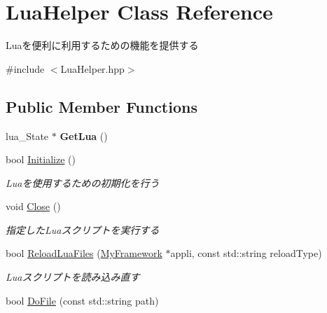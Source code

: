 \hypertarget{class_lua_helper}{}\section{Lua\+Helper Class Reference}
\label{class_lua_helper}


Luaを便利に利用するための機能を提供する  




{\ttfamily \#include $<$Lua\+Helper.\+hpp$>$}

\subsection*{Public Member Functions}
\begin{DoxyCompactItemize}
\item 
lua\+\_\+\+State $\ast$ {\bfseries Get\+Lua} ()\hypertarget{class_lua_helper_a3738931605b20ba3a93884f29f7dbb04}{}\label{class_lua_helper_a3738931605b20ba3a93884f29f7dbb04}

\item 
bool \hyperlink{class_lua_helper_aca3c0411f11bec8d43ffade1837ba7aa}{Initialize} ()\hypertarget{class_lua_helper_aca3c0411f11bec8d43ffade1837ba7aa}{}\label{class_lua_helper_aca3c0411f11bec8d43ffade1837ba7aa}

\begin{DoxyCompactList}\small\item\em Luaを使用するための初期化を行う \end{DoxyCompactList}\item 
void \hyperlink{class_lua_helper_ad4d67528e295aff02653287258f2f1c3}{Close} ()\hypertarget{class_lua_helper_ad4d67528e295aff02653287258f2f1c3}{}\label{class_lua_helper_ad4d67528e295aff02653287258f2f1c3}

\begin{DoxyCompactList}\small\item\em 指定した\+Luaスクリプトを実行する \end{DoxyCompactList}\item 
bool \hyperlink{class_lua_helper_a153924ff92fba4630eeae6f75d197c9d}{Reload\+Lua\+Files} (\hyperlink{class_my_framework}{My\+Framework} $\ast$appli, const std\+::string reload\+Type)\hypertarget{class_lua_helper_a153924ff92fba4630eeae6f75d197c9d}{}\label{class_lua_helper_a153924ff92fba4630eeae6f75d197c9d}

\begin{DoxyCompactList}\small\item\em Luaスクリプトを読み込み直す \end{DoxyCompactList}\item 
bool \hyperlink{class_lua_helper_ab9bb186436aa630ccb055bce2ca85878}{Do\+File} (const std\+::string path)\hypertarget{class_lua_helper_ab9bb186436aa630ccb055bce2ca85878}{}\label{class_lua_helper_ab9bb186436aa630ccb055bce2ca85878}


\end{DoxyCompactItemize}
